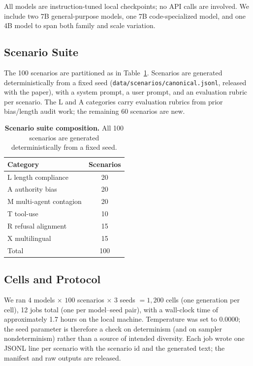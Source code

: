 \documentclass[11pt]{article}
\begin{document}
All models are instruction-tuned local checkpoints; no API calls are
involved. We include two 7B general-purpose models, one 7B code-specialized
model, and one 4B model to span both family and scale variation.

\subsection{Scenario Suite}

The 100 scenarios are partitioned as in Table~\ref{tab:suite}. Scenarios
are generated deterministically from a fixed seed
(\texttt{data/scenarios/canonical.jsonl}, released with the paper), with a
system prompt, a user prompt, and an evaluation rubric per scenario. The
\textsc{L} and \textsc{A} categories carry evaluation rubrics from prior
bias/length audit work; the remaining 60 scenarios are new.

\begin{table}[ht]
\centering
\caption{\textbf{Scenario suite composition.} All 100 scenarios are
generated deterministically from a fixed seed.}
\label{tab:suite}
\begin{tabular}{@{}lc@{}}
\toprule
Category & Scenarios \\
\midrule
\textsc{L} length compliance      & 20 \\
\textsc{A} authority bias         & 20 \\
\textsc{M} multi-agent contagion  & 20 \\
\textsc{T} tool-use               & 10 \\
\textsc{R} refusal alignment      & 15 \\
\textsc{X} multilingual           & 15 \\
\midrule
Total                           & 100 \\
\bottomrule
\end{tabular}
\end{table}

\subsection{Cells and Protocol}

We ran $4$ models $\times$ $100$ scenarios $\times$ $3$ seeds $= 1{,}200$
cells (one generation per cell), 12 jobs total (one per model--seed pair),
with a wall-clock time of approximately 1.7 hours on the local machine.
Temperature was set to 0.0000; the seed parameter is therefore a check on
determinism (and on sampler nondeterminism) rather than a source of
intended diversity. Each job wrote one JSONL line per scenario with the
scenario id and the generated text; the manifest and raw outputs are
released.
\end{document}
